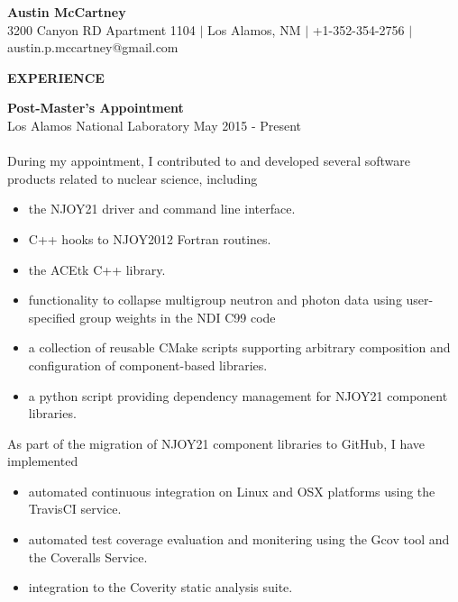 \documentclass[legalpaper]{article}
\begin{document}
\setlength\multicolsep{0pt}
\pagestyle{empty}

\begin{center}
  {\Large \textbf{Austin McCartney}\\}
  3200 Canyon RD Apartment 1104 $\vert$ Los Alamos, NM $\vert$ +1-352-354-2756 $\vert$ austin.p.mccartney@gmail.com
\end{center}

\begin{center}
  \begin{shaded}
    { \color{white} \textbf{EXPERIENCE}}
  \end{shaded}
\end{center}

\textbf{Post-Master's Appointment}\\
Los Alamos National Laboratory \hfill May 2015 - Present\\
~\\
During my appointment, I contributed to and developed several software products related to nuclear science, including 
\medskip
\begin{itemize}[noitemsep, before={\vspace*{-0.5\baselineskip}}]
\item the NJOY21 driver and command line interface.
\item C++ hooks to NJOY2012 Fortran routines.
\item the ACEtk C++ library.
\item functionality to collapse multigroup neutron and photon data using user-specified group weights in the NDI C99 code
\item a collection of reusable CMake scripts supporting arbitrary composition and configuration of component-based libraries.
\item a python script providing dependency management for NJOY21 component libraries.
\end{itemize}

As part of the migration of NJOY21 component libraries to GitHub, I have implemented
\medskip
\begin{itemize}[noitemsep, before={\vspace*{-0.5\baselineskip}}]
\item automated continuous integration on Linux and OSX platforms using the TravisCI service.
\item automated test coverage evaluation and monitering using the Gcov tool and the Coveralls Service.
\item integration to the Coverity static analysis suite.
\end{itemize}
\end{document}
